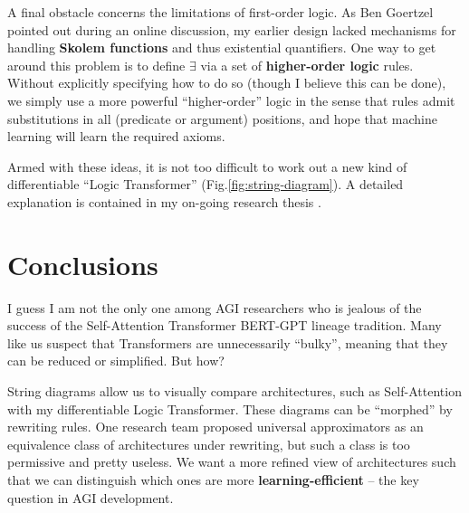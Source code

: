 \documentclass[runningheads]{llncs}
\begin{document}
A final obstacle concerns the limitations of first-order logic.  As Ben Goertzel pointed out during an online discussion, my earlier design lacked mechanisms for handling \textbf{Skolem functions} and thus existential quantifiers.  One way to get around this problem is to define $\exists$ via a set of \textbf{higher-order logic} rules.  Without explicitly specifying how to do so (though I believe this can be done), we simply use a more powerful ``higher-order'' logic in the sense that rules admit substitutions in all (predicate or argument) positions, and hope that machine learning will learn the required axioms.

Armed with these ideas, it is not too difficult to work out a new kind of differentiable ``Logic Transformer'' (Fig.\ref{fig:string-diagram}).  A detailed explanation is contained in my on-going research thesis \cite{YKY}.


\section*{Conclusions}

I guess I am not the only one among AGI researchers who is jealous of the success of the Self-Attention Transformer BERT-GPT lineage tradition.  Many like us suspect that Transformers are unnecessarily ``bulky'', meaning that they can be reduced or simplified.  But how?

String diagrams allow us to visually compare architectures, such as Self-Attention with my differentiable Logic Transformer.  These diagrams can be ``morphed'' by rewriting rules.  One research team proposed universal approximators as an equivalence class of architectures under rewriting, but such a class is too permissive and pretty useless.  We want a more refined view of architectures such that we can distinguish which ones are more \textbf{learning-efficient} -- the key question in AGI development.
\end{document}
